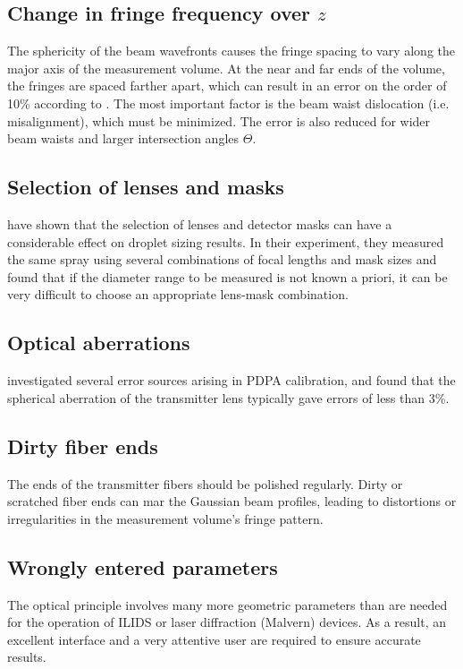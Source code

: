 \documentclass[11.5pt,oneside]{book}
\begin{document}
\subsection{Change in fringe frequency over $z$}
The sphericity of the beam wavefronts causes the fringe spacing to vary along
the major axis of the measurement volume. At the near and far ends of the
volume, the fringes are spaced farther apart, which can result in an error on
the order of 10\% according to \citet{Albrecht03}. The most important factor is
the beam waist dislocation (i.e. misalignment), which must be minimized. The
error is also reduced for wider beam waists and larger intersection angles
$\Theta$.

\subsection{Selection of lenses and masks}
\citet{Davis04} have shown that the selection of lenses and detector masks
can have a considerable effect on droplet sizing results. In their experiment,
they measured the same spray using several combinations of focal lengths and mask
sizes and found that if the diameter range to be measured is not known a priori,
it can be very difficult to choose an appropriate lens-mask combination.

\subsection{Optical aberrations}
\citet{Dressler90} investigated several error sources arising in PDPA
calibration, and found that the spherical aberration of the transmitter lens
typically gave errors of less than 3\%.

\subsection{Dirty fiber ends}
The ends of the transmitter fibers should be polished regularly. Dirty or
scratched fiber ends can mar the Gaussian beam profiles, leading to distortions
or irregularities in the measurement volume's fringe pattern.

\subsection{Wrongly entered parameters}
The optical principle involves many more geometric parameters than are needed
for the operation of ILIDS or laser diffraction (Malvern) devices. As a result, an
excellent interface and a very attentive user are required to ensure accurate
results.
\end{document}
